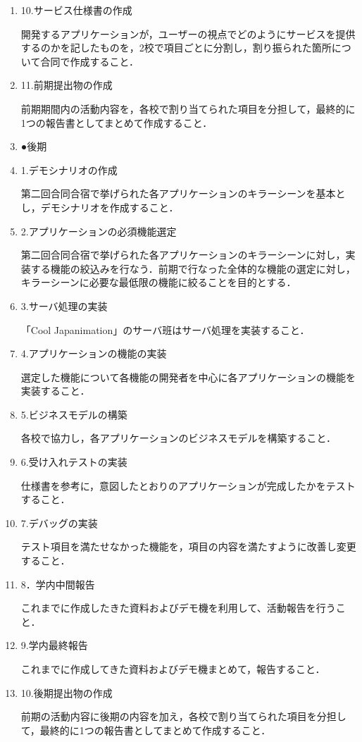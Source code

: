 \begin{enumerate}
\item 10.サービス仕様書の作成
\par 開発するアプリケーションが，ユーザーの視点でどのようにサービスを提供するのかを記したものを，2校で項目ごとに分割し，割り振られた箇所について合同で作成すること．
\item 11.前期提出物の作成
\par 前期期間内の活動内容を，各校で割り当てられた項目を分担して，最終的に1つの報告書としてまとめて作成すること．
\item ●後期
\item 1.デモシナリオの作成
\par 第二回合同合宿で挙げられた各アプリケーションのキラーシーンを基本とし，デモシナリオを作成すること．
\item 2.アプリケーションの必須機能選定
\par 第二回合同合宿で挙げられた各アプリケーションのキラーシーンに対し，実装する機能の絞込みを行なう．前期で行なった全体的な機能の選定に対し，キラーシーンに必要な最低限の機能に絞ることを目的とする．
\item 3.サーバ処理の実装
\par 「Cool Japanimation」のサーバ班はサーバ処理を実装すること．
\item 4.アプリケーションの機能の実装
\par 選定した機能について各機能の開発者を中心に各アプリケーションの機能を実装すること．
\item 5.ビジネスモデルの構築
\par 各校で協力し，各アプリケーションのビジネスモデルを構築すること．
\item 6.受け入れテストの実装
\par 仕様書を参考に，意図したとおりのアプリケーションが完成したかをテストすること．
\item 7.デバッグの実装
\par テスト項目を満たせなかった機能を，項目の内容を満たすように改善し変更すること．
\item 8．学内中間報告
\par これまでに作成したきた資料およびデモ機を利用して、活動報告を行うこと．
\item 9.学内最終報告
\par これまでに作成してきた資料およびデモ機まとめて，報告すること． 
\item 10.後期提出物の作成
\par 前期の活動内容に後期の内容を加え，各校で割り当てられた項目を分担して，最終的に1つの報告書としてまとめて作成すること．
\end{enumerate}
